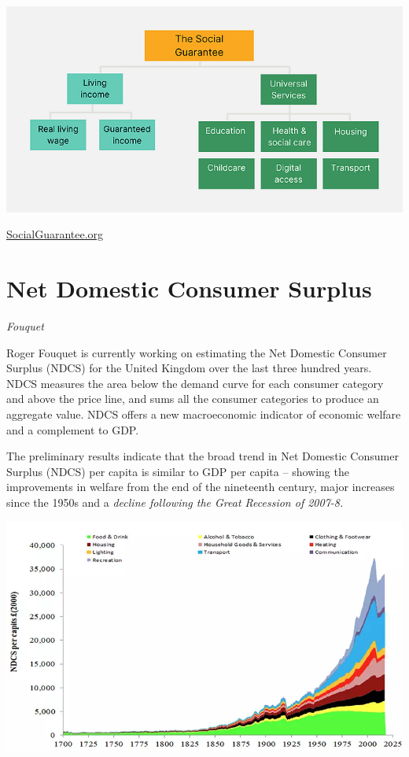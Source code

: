 \documentclass[
]{book}
\begin{document}
\includegraphics{fig/social_guarantee.png}

\href{https://www.socialguarantee.org/}{SocialGuarantee.org}

\hypertarget{net-domestic-consumer-surplus}{%
\section{Net Domestic Consumer Surplus}\label{net-domestic-consumer-surplus}}

\emph{Fouquet}

Roger Fouquet is currently working on estimating the Net Domestic Consumer Surplus (NDCS) for the United Kingdom over the last three hundred years. NDCS measures the area below the demand curve for each consumer category and above the price line, and sums all the consumer categories to produce an aggregate value. NDCS offers a new macroeconomic indicator of economic welfare and a complement to GDP.

The preliminary results indicate that the broad trend in Net Domestic Consumer Surplus (NDCS) per capita is similar to GDP per capita -- showing the improvements in welfare from the end of the nineteenth century, major increases since the 1950s and a \emph{decline following the Great Recession of 2007-8.}

\includegraphics{fig/net_domestic_consumer_surplus_pc.png}
\end{document}
